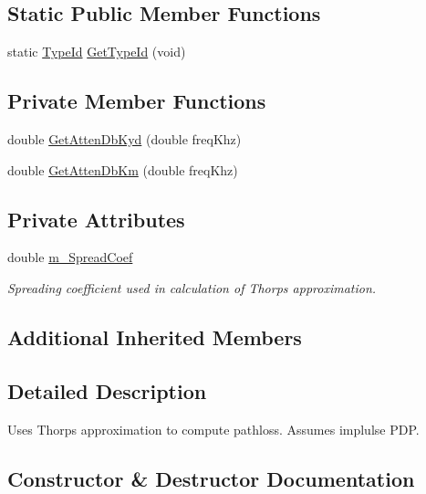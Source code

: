 \subsection*{Static Public Member Functions}
\begin{DoxyCompactItemize}
\item 
static \hyperlink{classns3_1_1TypeId}{Type\+Id} \hyperlink{classns3_1_1UanPropModelThorp_a78000eb02b2324539cc12d6f7f71aa48}{Get\+Type\+Id} (void)
\end{DoxyCompactItemize}
\subsection*{Private Member Functions}
\begin{DoxyCompactItemize}
\item 
double \hyperlink{classns3_1_1UanPropModelThorp_afafdc38c552f8e7dda5964669776a0fe}{Get\+Atten\+Db\+Kyd} (double freq\+Khz)
\item 
double \hyperlink{classns3_1_1UanPropModelThorp_a6a8658a67333d766c3e7d27005e308af}{Get\+Atten\+Db\+Km} (double freq\+Khz)
\end{DoxyCompactItemize}
\subsection*{Private Attributes}
\begin{DoxyCompactItemize}
\item 
double \hyperlink{classns3_1_1UanPropModelThorp_ade697d025d7d23ea54b3267c40cb9f88}{m\+\_\+\+Spread\+Coef}
\begin{DoxyCompactList}\small\item\em Spreading coefficient used in calculation of Thorp\textquotesingle{}s approximation. \end{DoxyCompactList}\end{DoxyCompactItemize}
\subsection*{Additional Inherited Members}


\subsection{Detailed Description}
Uses Thorp\textquotesingle{}s approximation to compute pathloss. Assumes implulse P\+DP. 

\subsection{Constructor \& Destructor Documentation}
